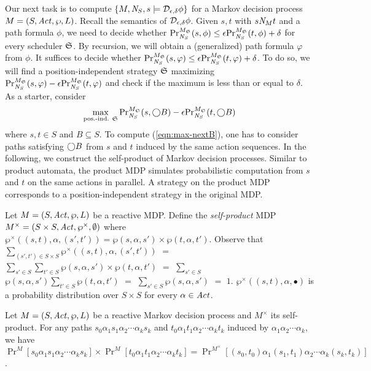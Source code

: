 
Our next task is to compute $\{ M, \neighbor{S}, s \models
\dpriv{\epsilon}{\delta} \phi \}$ for a Markov decision process $M =
(S, \Act, \wp, L)$. Recall the semantics of $\dpriv{\epsilon}{\delta}
\phi$. Given $s, t$ with $s \neighbor{M} t$ and a path formula
$\phi$, we need to decide whether
$\myPr{s}{M_{\scheduler{S}}}{\neighbor{S}}{\phi} \leq
\epsilon \myPr{t}{M_{\scheduler{S}}}{\neighbor{S}}{\phi} + \delta$
for every scheduler $\scheduler{S}$.
By recursion, we will obtain a
(generalized) path formula $\varphi$ from $\phi$. It suffices to
decide whether
$\myPr{s}{M_{\scheduler{S}}}{\neighbor{S}}{\varphi} \leq
\epsilon \myPr{t}{M_{\scheduler{S}}}{\neighbor{S}}{\varphi} + \delta$.
To do so, we will find a position-independent strategy $\scheduler{S}$
maximizing $\myPr{s}{M_{\scheduler{S}}}{\neighbor{S}}{\varphi} -
\epsilon \myPr{t}{M_{\scheduler{S}}}{\neighbor{S}}{\varphi}$ and check
if the maximum is less than or equal to $\delta$.
As a starter, consider
\begin{eqnarray}
  \label{eqn:max-nextB}
\max_{\textmd{pos.-ind. } \scheduler{S}}
\myPr{s}{M_{\scheduler{S}}}{\neighbor{S}}{\gX B} -
\epsilon \myPr{t}{M_{\scheduler{S}}}{\neighbor{S}}{\gX B}
\end{eqnarray}
where $s, t \in S$ and $B \subseteq S$. To compute
(\ref{eqn:max-nextB}), one has to consider paths satisfying $\gX B$
from $s$ and $t$ induced by the same action sequences. In the
following, we construct the self-product of Markov decision
processes. Similar to product automata, the product MDP simulates
probabilistic computation from $s$ and $t$ on the same actions in
parallel. A strategy on the product MDP corresponds to a
position-independent strategy in the original MDP.

Let $M = (S, \Act, \wp, L)$ be a reactive MDP.
Define the \emph{self-product} MDP
$M^{\times} = (S \times S, \Act, \wp^{\times}, \emptyset)$ where
$\wp^{\times} ((s, t), \alpha, (s', t')) = \wp (s, \alpha, s') \times
\wp (t, \alpha,
t')$. Observe that $\sum_{(s', t') \in S \times S} \wp^{\times} ((s, t),
\alpha, (s', t'))$ $=$ $\sum_{s' \in S} \sum_{t' \in S} \wp (s, \alpha,
s') \times \wp (t, \alpha, t')$ $=$ $\sum_{s' \in S}$ $\wp (s, \alpha, s')
\sum_{t' \in S} \wp (t, \alpha, t')$ $=$ $\sum_{s' \in S} \wp (s, \alpha,
s')$ $=$ $1$. $\wp^{\times} ((s, t), \alpha, \bullet)$ is a probability
distribution over $S \times S$ for every $\alpha \in \Act$.

\begin{lemma}
  Let $M = (S, \Act, \wp, L)$ be a reactive Markov decision process and
  $M^{\times}$ its self-product. For any paths $s_0\alpha_1s_1\alpha_2
  \cdots \alpha_k s_k$ and $t_0 \alpha_1 t_1 \alpha_2 \cdots \alpha_k
  t_k$ induced by $\alpha_1 \alpha_2 \cdots \alpha_k$, we have
  $\Pr^{M} [s_0 \alpha_1 s_1 \alpha_2 \cdots \alpha_k s_k] \times
  \Pr^{M} [t_0 \alpha_1 t_1 \alpha_2 \cdots \alpha_k t_k] =
  \Pr^{M^{\times}} [(s_0, t_0) \alpha_1 (s_1, t_1) \alpha_2 \cdots
  \alpha_k (s_k, t_k)]$.
  \label{lemma:joint-probability}
\end{lemma}

